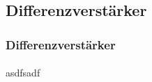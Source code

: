 \subsection{Differenzverstärker} %
\label{sub:Differenzverstärker}
\begin{frame}
    \frametitle{Differenzverstärker}
    \framesubtitle{}
    asdfsadf    
\end{frame}

